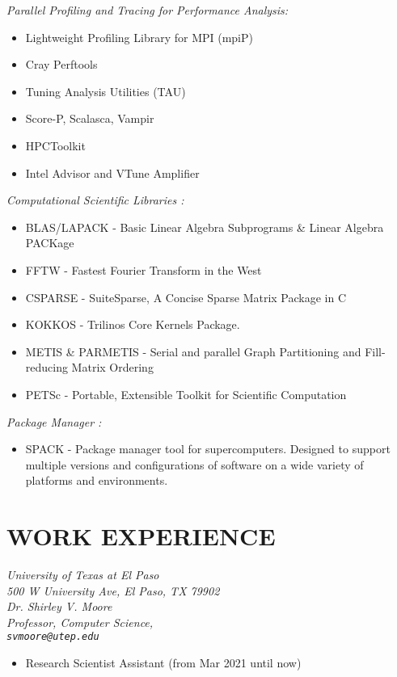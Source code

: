 \documentclass[margin]{res}
\begin{document}
\begin{resume}
{\sl Parallel Profiling and Tracing for Performance Analysis:}
  \begin{itemize}  \itemsep -1pt  
      \item Lightweight Profiling Library for MPI (mpiP)
      \item Cray Perftools
      \item Tuning Analysis Utilities (TAU)
      \item Score-P, Scalasca, Vampir
      \item HPCToolkit
      \item Intel Advisor and VTune Amplifier
    \end{itemize}
    
{\sl Computational Scientific  Libraries :}
  \begin{itemize}  \itemsep -1pt  
      \item BLAS/LAPACK - Basic Linear Algebra Subprograms \& Linear Algebra PACKage 
      \item FFTW - Fastest Fourier Transform in the West
      \item CSPARSE - SuiteSparse, A Concise Sparse Matrix Package in C
      \item KOKKOS - Trilinos Core Kernels Package.
      \item METIS \& PARMETIS - Serial and parallel Graph Partitioning and Fill-reducing Matrix Ordering
      \item PETSc - Portable, Extensible Toolkit for Scientific Computation
    \end{itemize}
    
{\sl Package Manager :}
  \begin{itemize}  \itemsep -1pt  
      \item SPACK - Package manager tool for supercomputers. Designed to support multiple versions and configurations of software on a wide variety of platforms and environments.
    \end{itemize}    
    
\section{WORK EXPERIENCE}
{\sl University of Texas at El Paso\\
500 W University Ave, El Paso, TX  79902\\
Dr. Shirley V. Moore\\
Professor, Computer Science,\\
\verb+svmoore@utep.edu+
} \hfill  
\begin{itemize}
\item Research Scientist Assistant (from Mar 2021 until now)
\end{itemize}


\end{resume}
\end{document}

